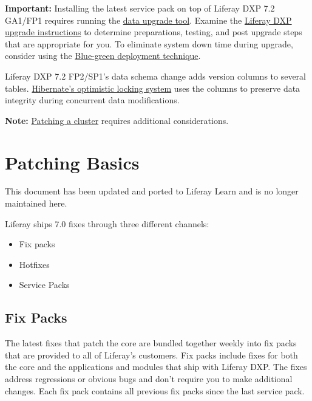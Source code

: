\noindent\hrulefill

\noindent\hrulefill

\textbf{Important:} Installing the latest service pack on top of Liferay
DXP 7.2 GA1/FP1 requires running the
\href{/docs/7-2/deploy/-/knowledge_base/d/upgrading-the-product-data}{data
upgrade tool}. Examine the
\href{/docs/7-2/deploy/-/knowledge_base/d/upgrading-to-product-ver}{Liferay
DXP upgrade instructions} to determine preparations, testing, and post
upgrade steps that are appropriate for you. To eliminate system down
time during upgrade, consider using the
\href{/docs/7-2/deploy/-/knowledge_base/d/other-cluster-update-techniques}{Blue-green
deployment technique}.

Liferay DXP 7.2 FP2/SP1's data schema change adds version columns to
several tables.
\href{https://docs.jboss.org/hibernate/orm/4.0/devguide/en-US/html/ch05.html\#d0e2225}{Hibernate's
optimistic locking system} uses the columns to preserve data integrity
during concurrent data modifications.

\noindent\hrulefill

\noindent\hrulefill

\textbf{Note:}
\href{/docs/7-2/deploy/-/knowledge_base/d/updating-a-cluster}{Patching a
cluster} requires additional considerations.

\chapter{Patching Basics}\label{patching-basics}

{This document has been updated and ported to Liferay Learn and is no
longer maintained here.}

Liferay ships 7.0 fixes through three different channels:

\begin{itemize}
\tightlist
\item
  Fix packs
\item
  Hotfixes
\item
  Service Packs
\end{itemize}

\section{Fix Packs}\label{fix-packs}

The latest fixes that patch the core are bundled together weekly into
fix packs that are provided to all of Liferay's customers. Fix packs
include fixes for both the core and the applications and modules that
ship with Liferay DXP. The fixes address regressions or obvious bugs and
don't require you to make additional changes. Each fix pack contains all
previous fix packs since the last service pack.


